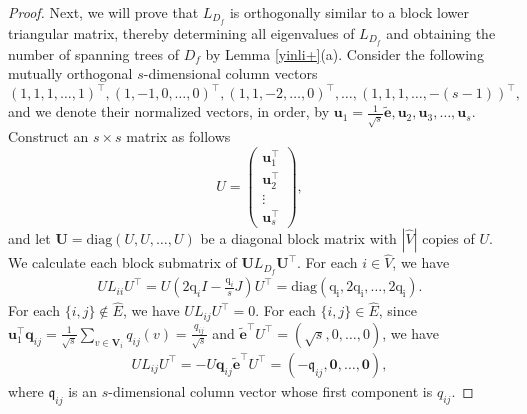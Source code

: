 \documentclass{article}
\begin{document}
\begin{proof}
Next,
we will prove that $L_{D_f}$ is orthogonally similar to a block lower triangular matrix,
thereby determining all eigenvalues of $L_{D_f}$ and obtaining the number of spanning trees of $D_f$ by Lemma \ref{yinli+}(a).
Consider the following mutually orthogonal $s$-dimensional column vectors $$(1,1,1,\ldots,1)^{\top}, (1,-1,0,\ldots,0)^{\top}, (1,1,-2,\ldots,0)^{\top}, \ldots , (1,1,1,\ldots,-(s-1))^{\top},$$
and we denote their normalized vectors, in order, by $\mathbf{u}_{1}=\frac{1}{\sqrt{s}}\mathbf{\widetilde{e}},\mathbf{u}_{2},\mathbf{u}_{3},\ldots,\mathbf{u}_{s}$.
Construct an $s \times s$ matrix as follows
$$U=\begin{pmatrix} \mathbf{u}_{1}^{\top} \\ \mathbf{u}_{2}^{\top} \\ \vdots \\ \mathbf{u}_{s}^{\top} \end{pmatrix},$$
and let $\mathbf{U}=\mathrm{diag}(U,U,\ldots,U)$ be a diagonal block matrix with $|\widehat{V}|$ copies of $U$.
We calculate each block submatrix of $\mathbf{U}L_{D_f}\mathbf{U}^{\top}$.
For each $i \in \widehat{V}$,
we have
\begin{align}\label{eq6}
UL_{ii}U^{\top}=U\left(2\mathrm{q}_{i}I-\frac{\mathrm{q}_{i}}{s}J\right)U^{\top}=\mathrm{diag}(\mathrm{q_{i}},2\mathrm{q_{i}},\ldots,2\mathrm{q_{i}}).
\end{align}
For each $\{i,j\} \notin \widehat{E}$,
we have $UL_{ij}U^{\top}=0$.
For each $\{i,j\} \in \widehat{E}$,
since $\mathbf{u}_{1}^{\top} \mathbf{q}_{ij}=\frac{1}{\sqrt{s}}\sum_{v \in \mathbf{V}_{i}}q_{ij}(v)=\frac{q_{ij}}{\sqrt{s}}$
and $\mathbf{\widetilde{e}}^{\top}U^{\top}=(\sqrt{s},0,\ldots,0)$,
we have
\begin{align}\label{eq7}
UL_{ij}U^{\top}=-U\mathbf{q}_{ij}\mathbf{\widetilde{e}}^{\top}U^{\top}=(-\mathfrak{q}_{ij},\mathbf{0},\ldots,\mathbf{0}),
\end{align}
where $\mathfrak{q}_{ij}$ is an $s$-dimensional column vector whose first component is $q_{ij}$.


\end{proof}
\end{document}
